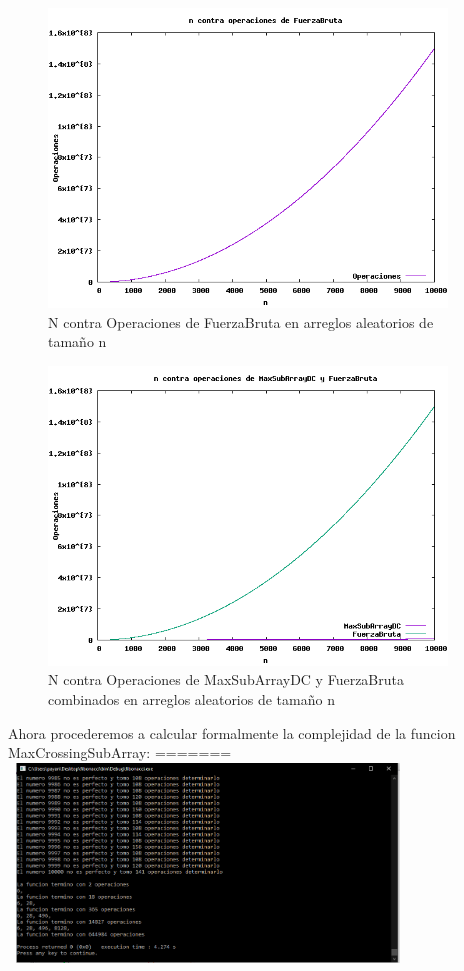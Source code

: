 \documentclass[spanish]{article}
\begin{document}
	\begin{figure}[H]
		\centering
		\includegraphics[width=400px,height=300px]{grafica10}
		\caption{N contra Operaciones de FuerzaBruta en arreglos aleatorios de tamaño n}
	\end{figure}
	\begin{figure}[H]
		\centering
		\includegraphics[width=400px,height=300px]{grafica11}
		\caption{N contra Operaciones de MaxSubArrayDC y FuerzaBruta combinados en arreglos aleatorios de tamaño n}
	\end{figure}
	Ahora procederemos a calcular formalmente la complejidad de la funcion MaxCrossingSubArray:
=======
		\includegraphics[width=400px,height=200px]{ejecucionTerceraParte}
\end{document}
